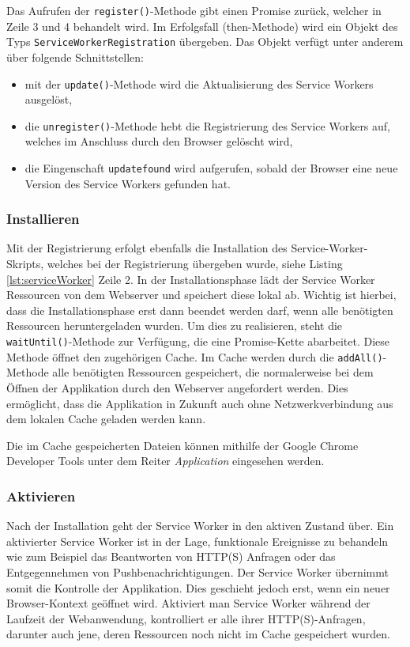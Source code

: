 Das Aufrufen der \texttt{register()}-Methode gibt einen Promise zurück, welcher in Zeile 3 und 4 behandelt wird. 
Im Erfolgsfall (then-Methode) wird ein Objekt des Typs \texttt{ServiceWorkerRegistration} übergeben. Das Objekt verfügt unter anderem über folgende Schnittstellen: 
\begin{itemize}
    \item mit der \texttt{update()}-Methode wird die Aktualisierung des Service Workers ausgelöst,
    \item die \texttt{unregister()}-Methode hebt die Registrierung des Service Workers auf, welches im Anschluss durch den Browser gelöscht wird,
    \item die Eingenschaft \texttt{updatefound} wird aufgerufen, sobald der Browser eine neue Version des Service Workers gefunden hat. 
\end{itemize}

\subsubsection{Installieren}

Mit der Registrierung erfolgt ebenfalls die Installation des Service-Worker-Skripts, welches bei der Registrierung übergeben wurde, siehe Listing \ref{lst:serviceWorker} Zeile 2.
In der Installationsphase lädt der Service Worker Ressourcen von dem Webserver und speichert diese lokal ab. Wichtig ist hierbei, dass die Installationsphase erst dann beendet werden darf, wenn alle benötigten Ressourcen heruntergeladen wurden. Um dies zu realisieren, steht die \texttt{waitUntil()}-Methode zur Verfügung, die eine Promise-Kette abarbeitet. Diese Methode öffnet den zugehörigen Cache. Im Cache werden durch die \texttt{addAll()}-Methode alle benötigten Ressourcen gespeichert, die normalerweise bei dem Öffnen der Applikation durch den Webserver angefordert werden. Dies ermöglicht, dass die Applikation in Zukunft auch ohne Netzwerkverbindung aus dem lokalen Cache geladen werden kann. 



Die im Cache gespeicherten Dateien können mithilfe der Google Chrome Developer Tools unter dem Reiter \textit{Application} eingesehen werden. 

\subsubsection{Aktivieren}

Nach der Installation geht der Service Worker in den aktiven Zustand über. Ein aktivierter Service Worker ist in der Lage, funktionale Ereignisse zu behandeln wie zum Beispiel das Beantworten von HTTP(S) Anfragen oder das Entgegennehmen von Pushbenachrichtigungen. 
Der Service Worker übernimmt somit die Kontrolle der Applikation. Dies geschieht jedoch erst, wenn ein neuer Browser-Kontext geöffnet wird. Aktiviert man Service Worker während der Laufzeit der Webanwendung, kontrolliert er alle ihrer HTTP(S)-Anfragen, darunter auch jene, deren Ressourcen noch nicht im Cache gespeichert wurden.


